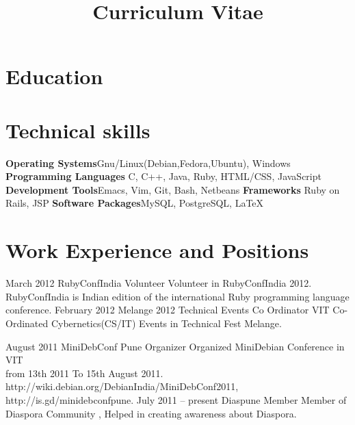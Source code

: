 \documentclass[11pt,a4paper]{moderncv}
\title{Curriculum Vitae}
\begin{document}
\maketitle

\section{Education}

\section{Technical skills}
\cvcomputer
{\textbf{Operating Systems}}{Gnu/Linux(Debian,Fedora,Ubuntu), Windows}
{\textbf{Programming Languages}}{ C, C++, Java, Ruby, HTML/CSS, JavaScript }
\cvcomputer
{\textbf{Development Tools}}{Emacs, Vim, Git, Bash, Netbeans}
{\textbf{Frameworks}}{ Ruby on Rails, JSP}
\cvcomputer
{\textbf{Software Packages}}{MySQL, PostgreSQL, LaTeX}
{}{}


\section{Work Experience and Positions}

\cventry    
            {March 2012}
            {RubyConfIndia}
            {Volunteer}
            {}
            {}
            {
              Volunteer in RubyConfIndia 2012. \\ 
              RubyConfIndia is Indian edition of the international
              Ruby programming language conference. 
            }
\cventry
            {February 2012}
            {Melange 2012 Technical Events }
            {Co Ordinator}
            {VIT}
            {}
            {
             Co-Ordinated Cybernetics(CS/IT) Events in Technical Fest
             Melange.
            } 

\cventry
            {August 2011}
            {MiniDebConf Pune}
            {Organizer}
            {}
            {}
            {
             Organized MiniDebian Conference in VIT \\
             from 13th 2011 To 15th August 2011.    \\
             http://wiki.debian.org/DebianIndia/MiniDebConf2011, \\
             http://is.gd/minidebconfpune.
           }
\cventry
           {July 2011 -- present}
           {Diaspune}
           {Member}
           {}
           {}
           {
            Member of Diaspora Community , Helped in creating
            awareness about Diaspora. 
           }
\end{document}

